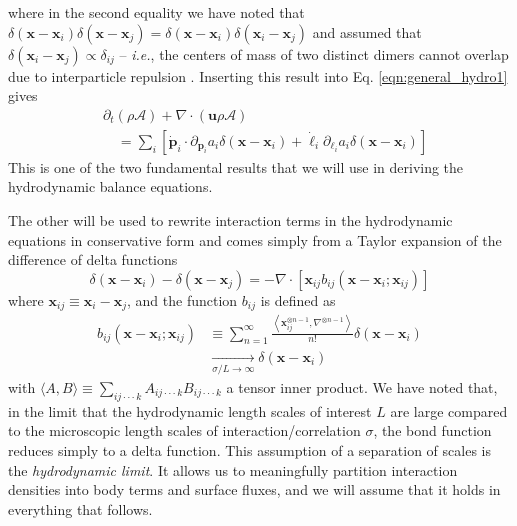 \documentclass[%
 reprint,
superscriptaddress,
longbibliography,
 amsmath,amssymb,
 prl,
 citeautoscript,
]{revtex4-1}
\begin{document}
where in the second equality we have noted that $\delta \left( {\boldsymbol x} - {\boldsymbol x}_i \right) \delta \left( {\boldsymbol x} - {\boldsymbol x}_j \right) = \delta \left( {\boldsymbol x} - {\boldsymbol x}_i \right) \delta \left( {\boldsymbol x}_i - {\boldsymbol x}_j \right)$ and assumed that $\delta \left( {\boldsymbol x}_i - {\boldsymbol x}_j \right) \propto \delta_{ij}$ -- {\it i.e.}, the centers of mass of two distinct dimers cannot overlap due to interparticle repulsion \cite{dean, Lubensky_PB}. Inserting this result into Eq. \ref{eqn:general_hydro1} gives
\begin{equation}
\begin{split}
&\partial_t \left( \rho \mathcal{A} \right) + \nabla \cdot \left( {\boldsymbol u} \rho \mathcal{A} \right) \\
&\quad = \sum_i \left[ \dot{\boldsymbol p}_i \cdot \partial_{{\boldsymbol p}_i} a_i \delta \left( {\boldsymbol x} - {\boldsymbol x}_i \right) + \dot{\ell}_i \partial_{\ell_i} a_i \delta \left( {\boldsymbol x} - {\boldsymbol x}_i \right) \right]
\end{split}
\label{eqn:general_hydro_final}
\end{equation}
This is one of the two fundamental results that we will use in deriving the hydrodynamic balance equations.

The other will be used to rewrite interaction terms in the hydrodynamic equations in conservative form and comes simply from a Taylor expansion of the difference of delta functions
\begin{equation}
\delta \left( {\boldsymbol x} - {\boldsymbol x}_i \right) - \delta \left( {\boldsymbol x} - {\boldsymbol x}_j \right) = - \nabla \cdot \left[ {\boldsymbol x}_{ij} b_{ij} \left( {\boldsymbol x} - {\boldsymbol x}_i; {\boldsymbol x}_{ij} \right) \right]
\label{eqn:delta_diff}
\end{equation}
where ${\boldsymbol x}_{ij} \equiv {\boldsymbol x}_i - {\boldsymbol x}_j$, and the function $b_{ij}$ is defined as
\begin{equation}
\begin{split}
b_{ij} \left( {\boldsymbol x} - {\boldsymbol x}_i; {\boldsymbol x}_{ij} \right) &\equiv \sum_{n = 1}^{\infty} \frac{\left\langle {\boldsymbol x}_{ij}^{\otimes n -1}, \nabla^{\otimes n -1} \right\rangle}{n!} \delta \left( {\boldsymbol x} - {\boldsymbol x}_i \right) \\
&\xrightarrow[\sigma/L \rightarrow \infty]{} \delta \left( {\boldsymbol x} - {\boldsymbol x}_i \right)
\end{split}
\label{eqn:bond_function}
\end{equation}
with $\langle A , B \rangle \equiv \sum_{ij \cdot \cdot \cdot k} A_{ij \cdot \cdot \cdot k} B_{ij \cdot \cdot \cdot k}$ a tensor inner product. We have noted that, in the limit that the hydrodynamic length scales of interest $L$ are large compared to the microscopic length scales of interaction/correlation $\sigma$, the bond function reduces simply to a delta function. This assumption of a separation of scales is the {\it hydrodynamic limit}. It allows us to meaningfully partition interaction densities into body terms and surface fluxes, and we will assume that it holds in everything that follows.
\end{document}
